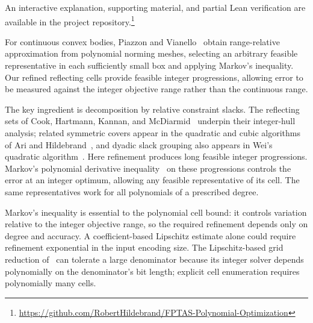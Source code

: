 \documentclass[final,5p,times,twocolumn]{elsarticle}
\theoremstyle{definition}\newtheorem{definition}{Definition}[section]
\theoremstyle{remark}\newtheorem{remark}[theorem]{Remark}
\begin{document}
An interactive explanation, supporting material, and partial Lean verification are available in the project repository.\footnote{\url{https://github.com/RobertHildebrand/FPTAS-Polynomial-Optimization}}

For continuous convex bodies, Piazzon and Vianello~\cite[Propositions~1--2]{PV} obtain range-relative approximation from polynomial norming meshes, selecting an arbitrary feasible representative in each sufficiently small box and applying Markov's inequality. Our refined reflecting cells provide feasible integer progressions, allowing error to be measured against the integer objective range rather than the continuous range.

The key ingredient is decomposition by relative constraint slacks. The reflecting sets of Cook, Hartmann, Kannan, and McDiarmid~\cite{CHKM} underpin their integer-hull analysis; related symmetric covers appear in the quadratic and cubic algorithms of Ari and Hildebrand~\cite{AH}, and dyadic slack grouping also appears in Wei's quadratic algorithm~\cite[Section~4.1]{Wei}. Here refinement produces long feasible integer progressions. Markov's polynomial derivative inequality~\cite[Theorem~5.1.8]{BorweinErdelyi} on these progressions controls the error at an integer optimum, allowing any feasible representative of its cell. The same representatives work for all polynomials of a prescribed degree.

Markov's inequality is essential to the polynomial cell bound: it controls variation relative to the integer objective range, so the required refinement depends only on degree and accuracy. A coefficient-based Lipschitz estimate alone could require refinement exponential in the input encoding size. The Lipschitz-based grid reduction of~\cite{DHKW08} can tolerate a large denominator because its integer solver depends polynomially on the denominator's bit length; explicit cell enumeration requires polynomially many cells.
\end{document}
